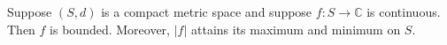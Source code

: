 Suppose $(S, d)$ is a compact metric space and suppose $f: S \to \mathbb{C}$ is continuous. Then $f$ is bounded. Moreover, $|f|$ attains its maximum and minimum on $S$.
